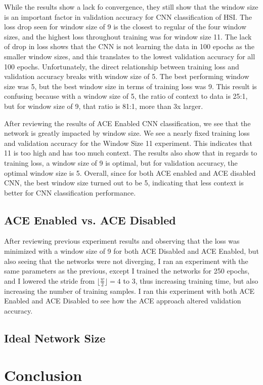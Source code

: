 \documentclass[12pt]{article}
\begin{document}
While the results show a lack fo convergence, they still show that the window size is an important factor in validation accuracy for CNN classification of HSI.
%
The loss drop seen for window size of 9 is the closest to regular of the four window sizes, and the highest loss throughout training was for window size 11.
%
The lack of drop in loss shows that the CNN is not learning the data in 100 epochs as the smaller window sizes, and this translates to the lowest validation accuracy for all 100 epochs.
%
Unfortunately, the direct relationship between training loss and validation accuracy breaks with window size of 5.
%
The best performing window size was 5, but the best window size in terms of training loss was 9. 
%
This result is confusing because with a window size of 5, the ratio of context to data is 25:1, but for window size of 9, that ratio is 81:1, more than 3x larger.

After reviewing the results of ACE Enabled CNN classification, we see that the network is greatly impacted by window size.
%
We see a nearly fixed training loss and validation accuracy for the Window Size 11 experiment. 
%
This indicates that 11 is too high and has too much context.
%
The results also show that in regards to training loss, a window size of 9 is optimal, but for validation accuracy, the optimal window size is 5.
%
Overall, since for both ACE enabled and ACE disabled CNN, the best window size turned out to be 5, indicating that less context is better for CNN classification performance.


\subsection{ACE Enabled vs. ACE Disabled}
After reviewing previous experiment results and observing that the loss was minimized with a window size of 9 for both ACE Disabled and ACE Enabled, but also seeing that the networks were not diverging, I ran an experiment with the same parameters as the previous, except I trained the networks for 250 epochs, and I lowered the stride from $\lfloor\frac{w}{2}\rfloor = 4$ to 3, thus increasing training time, but also increasing the number of training samples. 
%
I ran this experiment with both ACE Enabled and ACE Disabled to see how the ACE approach altered validation accuracy. 
\subsection{Ideal Network Size}

\section{Conclusion}\label{sec:conclusion}


\newpage
 

\end{document}
